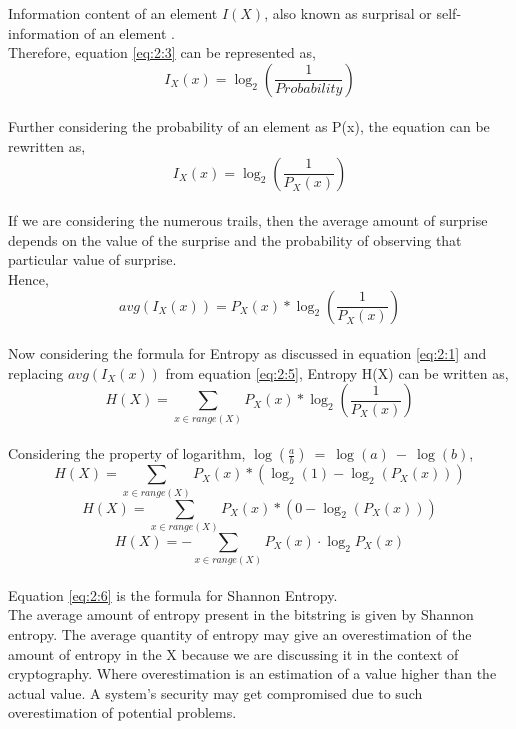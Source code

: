 Information content of an element $I(X)$, also known as surprisal or self-information of an element \cite{YT-2021}.\\
Therefore, equation \ref{eq:2:3} can be represented as,
\begin{equation*}
I_{X}(x) = \log_{2}\left(\frac{1}{Probability}\right)
\end{equation*}\\
Further considering the probability of an element as P(x), the equation can be rewritten as,
\begin{equation}\label{eq:2:4}
I_{X}(x) = \log_{2}\left(\frac{1}{P_{X}(x)}\right)
\end{equation}\\
If we are considering the numerous trails, then the average amount of surprise depends on the value of the surprise and the probability of observing that particular value of surprise.\\
Hence, 
\begin{equation}\label{eq:2:5}
avg\left(I_{X}(x)\right) = P_{X}(x)*\log_{2}\left(\frac{1}{P_{X}(x)}\right)
\end{equation}\\
Now considering the formula for Entropy as discussed in equation \ref{eq:2:1} and replacing $avg\left(I_{X}(x)\right)$ from equation \ref{eq:2:5}, Entropy H(X) can be written as,\\
\begin{equation*}
H(X) = \sum_{x \in range(X)}  P_{X}(x)*\log_{2}\left(\frac{1}{P_{X}(x)}\right)
\end{equation*}\\
Considering the property of logarithm, $\log(\frac{a}{b})\ =\ \log(a)\ {-} \ \log(b)$,
\begin{equation*}
	H(X) = \sum_{x \in range(X)}  P_{X}(x)*\left(\log_{2}(1) {-} \log_{2}\left(P_{X}(x)\right)\right)
\end{equation*}
\begin{equation*}
	H(X) = \sum_{x \in range(X)}  P_{X}(x)*\left(0 {-} \log_{2}\left(P_{X}(x)\right)\right)
\end{equation*}
\begin{equation}\label{eq:2:6}
H(X) = {-}\sum_{x \in range(X)} P_{X}(x)\cdot\log_{2}P_{X}(x) 
\end{equation}\\
Equation \ref{eq:2:6} is the formula for Shannon Entropy.\\
The average amount of entropy present in the bitstring is given by Shannon entropy. The average quantity of entropy may give an overestimation of the amount of entropy in the X because we are discussing it in the context of cryptography. Where overestimation is an estimation of a value higher than the actual value. A system’s security may get compromised due to such overestimation of potential problems.

